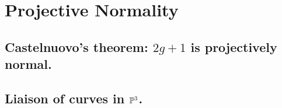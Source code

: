 

\chapter{Projective Normality}
\label{ProjectiveNormalityChapter}

\section{Castelnuovo's theorem: $2g+1$ is projectively normal.}
\section{Liaison of curves in $\PP^3$.}

